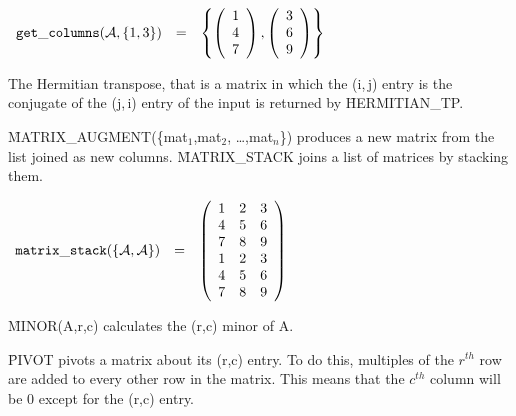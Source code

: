 \begin{flushleft}  
\hspace*{0.1in}
\begin{math}  
\begin{array}{ccc}
{\tt get\_columns}({\cal A},\{1,3\}) & = & 
\left\{ 
        \left( \begin{array}{c} 1 \\ 4 \\ 7 \end{array} \right),
        \left( \begin{array}{c} 3 \\ 6 \\ 9 \end{array} \right) 
\right\} 
\end{array}
\end{math}  
\end{flushleft}

The Hermitian transpose, that is a matrix in which the (i,$\,$j) entry is the conjugate of 
the (j,$\,$i) entry of the input is returned by \f{HERMITIAN\_TP}.

\f{MATRIX\_AUGMENT}(\{mat$_{1}$,mat$_{2}$, \ldots ,mat$_{n}$\})
produces a new matrix from the list joined as new columns.
\f{MATRIX\_STACK} joins a list of matrices by
stacking them.

\begin{flushleft}  
\hspace*{0.1in}
\begin{math}  
\begin{array}{ccc}
{\tt matrix\_stack}(\{{\cal A,A}\}) & = & 
        \left( \begin{array}{ccc} 1 & 2 & 3 \\ 4 & 5 & 6 \\ 7 & 8 & 9 
\\ 1 & 2 & 3 \\ 4 & 5 & 6 \\ 7 & 8 & 9 
 \end{array} \right) 
\end{array}
\end{math}  
\end{flushleft}

\f{MINOR}(A,r,c) calculates the (r,c) minor of A.

\f{PIVOT} pivots a matrix about its (r,c) entry.
To do this, multiples of the $r^{th}$ row are added to every other row in
the matrix.  This means that the $c^{th}$ column will be 0 except for
the (r,c) entry.

